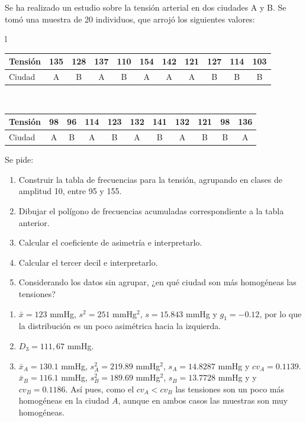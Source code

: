 {Se ha realizado un estudio sobre la tensión arterial en dos ciudades A y B. Se tomó una muestra de 20 individuos, que arrojó los siguientes valores:
\begin{center}
\begin{tabular}{l}
\begin{tabular}{|l|c|c|c|c|c|c|c|c|c|c|}
\hline
 Tensión & 135 & 128 & 137 & 110 & 154 & 142 & 121 & 127 & 114 & 103 \\
\hline
 Ciudad  &  A  &  B  &  A  &  B  &  A  &  A  &  A  &  B  &  B  &  B  \\
\hline
\end{tabular}
\\[.5cm]
\begin{tabular}{|l|c|c|c|c|c|c|c|c|c|c|}
\hline
 Tensión & 98 & 96 & 114 & 123 & 132 & 141 & 132 & 121 & 98 & 136 \\
\hline
 Ciudad  & A  & B  &  A  &  B  &  A  &  B  &  A  &  B  & B  &  A  \\
\hline
\end{tabular}
\end{tabular}
\end{center}
Se pide:
\begin{enumerate}
\item Construir la tabla de frecuencias para la tensión, agrupando en clases de amplitud 10, entre 95 y 155.
\item Dibujar el polígono de frecuencias acumuladas correspondiente a la tabla anterior.
\item Calcular el coeficiente de asimetría e interpretarlo.
\item Calcular el tercer decil e interpretarlo.
\item Considerando los datos sin agrupar, ¿en qué ciudad son más homogéneas las tensiones?
\end{enumerate}
}
{\begin{enumerate}[start=3]
\item $\bar x = 123$ mmHg, $s^2= 251$ mmHg$^2$, $s=15.843$ mmHg y $g_1=-0.12$, por lo que la distribución es un poco asimétrica hacia la izquierda.
\item $D_3= 111,67$ mmHg.
\item $\bar x_A=130.1$ mmHg, $s^2_A=219.89$ mmHg$^2$, $s_A=14.8287$ mmHg y $cv_A =0.1139$.\\
$\bar x_B=116.1$ mmHg, $s^2_B=189.69$ mmHg$^2$, $s_B=13.7728$ mmHg y y $cv_B = 0.1186$.
Así pues, como el $cv_A<cv_B$ las tensiones son un poco más homogéneas en la ciudad $A$, aunque en ambos casos las muestras son muy homogéneas. 
\end{enumerate}
}
